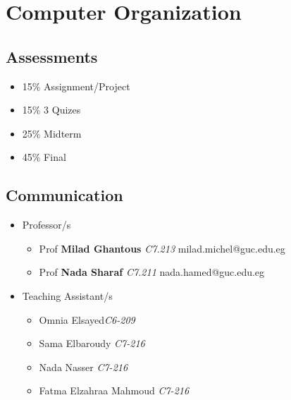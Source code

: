 \documentclass[11pt]{article}
\begin{document}
\section{Computer Organization}
\begin{multicols}{2}
\subsection{Assessments}

\begin{itemize}
	\item 15\%  Assignment/Project
\item 15\% 3 Quizes
\item 25\% Midterm
\item 45\% Final
\end{itemize}
\subsection{Communication}
\begin{itemize}

\item Professor/s 
\begin{itemize}
	\item Prof \textbf{Milad Ghantous} \textit{C7.213} milad.michel@guc.edu.eg  
	\item Prof \textbf{Nada Sharaf} \textit{C7.211} nada.hamed@guc.edu.eg  

\end{itemize}
\item Teaching Assistant/s
\begin{itemize}

	\item Omnia Elsayed\textit{C6-209} 
	\item Sama Elbaroudy \textit{C7-216} 
	\item Nada Nasser \textit{C7-216} 
	\item Fatma Elzahraa Mahmoud \textit{C7-216}  
		\end{itemize}
\end{itemize}
\end{multicols}
\end{document}
